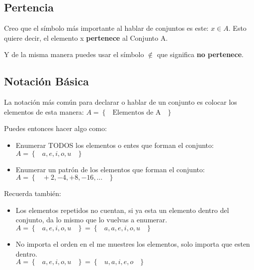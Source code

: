 \documentclass[12pt, fleqn]{report}                             %
\DeclareMathOperator \Space {\quad}                             %
\DeclareMathOperator \MiniSpace {\;}                            %
\newcommand{\Set}[1]{\left\{ \MiniSpace #1 \MiniSpace \right\}} %
\begin{document}
            \subsection{Pertencia}

            Creo que el símbolo más importante al hablar de conjuntos es este: $x \in A $.
            Esto quiere decir, el elemento x \textbf{pertenece} al Conjunto A.

            
            Y de la misma manera puedes usar el símbolo $\notin$ que significa
            \textbf{no pertenece}.


            \subsection{Notación Básica}

                La notación más común para declarar o hablar de un conjunto es colocar los elementos
                de esta manera: $ A = \Set{ \text{Elementos de A} }$

                Puedes entonces hacer algo como:
                \begin{itemize}
                    \item Enumerar TODOS los elementos o entes que forman el conjunto:
                    \\$A = \Set{a, e, i, o, u}$

                    \item Enumerar un patrón de los elementos que forman el conjunto:
                    \\$A = \Set{+2, -4, +8, -16, \dots}$
                \end{itemize}


                Recuerda también:
                \begin{itemize}
                    \item Los elementos repetidos no cuentan, si ya esta un elemento dentro del
                        conjunto, da lo mismo que lo vuelvas a enumerar.\\
                        $A = \Set{a, e, i, o, u} = \Set{a, a, e, i, o, u}$

                    \item No importa el orden en el me muestres los elementos,
                        solo importa que esten dentro.\\
                        $A = \Set{a, e, i, o, u} = \Set{u, a, i, e, o}$
                \end{itemize}
\end{document}
